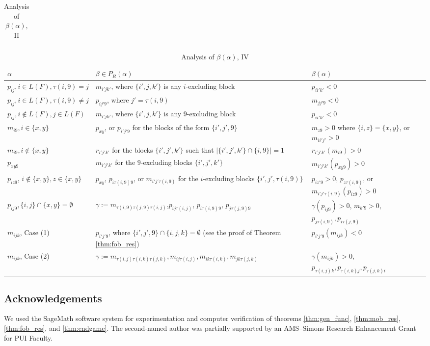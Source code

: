 \documentclass[11pt]{amsart}
\theoremstyle{plain}
\theoremstyle{definition}
\theoremstyle{remark}
\numberwithin{equation}{section}
\newcommand{\al}{\alpha}
\newcommand{\be}{\beta}
\newcommand{\pra}{P_R(\al)}
\newcommand{\abs}[1]{\lvert #1 \rvert}
\begin{document}
\begin{landscape}
\begin{table}[b]
\begin{tabular}{@{}lll@{}}
\end{tabular}
\caption{Analysis of $\be(\al)$, II}
\label{tab:mob2}
\end{table}
%
\begin{table}[b]
  \centering
\begin{tabular}{@{}lll@{}}
\toprule
  $\al$ & $\be\in \pra$ & $\be(\al)$ \\
  \midrule
  $p_{ij}, i\in L(F), \tau(i,9)=j$ & $m_{i'jk'}$, where $\{i',j,k'\}$ is any
 $i$-excluding block & $p_{ii'k'}<0$ \\
  $p_{ij}, i\in L(F),\tau(i,9)\neq j$ & $p_{ij'9}$, where $j'=\tau(i,9)$ & $m_{jj'9}<0$\\
  $p_{ij}, i\notin L(F), j\in L(F)$ & $m_{i'jk'}$, where $\{i',j,k'\}$ is any
 $9$-excluding block& $p_{ii'k'}<0$\\
  \midrule
  $m_{i9}, i\in \{x,y\}$ & $p_{xy}$, or $p_{i'j'9}$ for the blocks of the form
  $\{i',j',9\}$ & $m_{z9}>0$ where $\{i,z\}=\{x,y\}$, or $m_{ii'j'}>0$\\
  $m_{i9}, i\notin\{x,y\}$ & $r_{i'j'k'}$ for the blocks $\{i',j',k'\}$ such that $\abs{\{i',j',k'\}\cap \{i,9\}}=1$& $r_{i'j'k'}(m_{i9})>0$ \\
  \midrule
  $p_{xy9}$ & $m_{i'j'k'}$ for the $9$-excluding blocks $\{i',j',k'\}$  & $m_{i'j'k'}(p_{xy9})>0$\\
  $p_{iz9}$, $i\notin \{x,y\},z\in \{x,y\}$ & $p_{xy}$, $p_{i\tau(i,9)9}$, or
  $m_{i'j'\tau(i,9)}$ for the $i$-excluding blocks $\{i',j',\tau(i,9)\}$& $p_{iz'9}>0$,
$p_{z\tau(i,9)}$, or $m_{i'j'\tau(i,9)}(p_{iz9})>0$\\ 
  $p_{ij9}, \{i,j\}\cap \{x,y\}=\emptyset$ &
  $\gamma:=m_{\tau(i,9)\tau(j,9)\tau(i,j)}$,$p_{ij\tau(i,j)}$,
  $p_{i\tau(i,9)9}$, $p_{j\tau(j,9)9}$ & $\gamma(p_{ij9})>0$, $m_{k'9}>0$,
  $p_{j\tau(i,9)}, p_{i\tau(j,9)}$\\
  \midrule
  $m_{ijk}$, Case (1) & $p_{i'j'9}$, where $\{i',j',9\}\cap\{i,j,k\}=\emptyset$
  (see the proof of Theorem \ref{thm:fob_res}) & $p_{i'j'9}(m_{ijk})<0$\\
  $m_{ijk}$, Case (2) & $\gamma:=m_{\tau(i,j)\tau(i,k)\tau(j,k)}, m_{ij\tau(i,j)},m_{ik\tau(i,k)}, m_{jk\tau(j,k)}
  $ & $\gamma(m_{ijk})>0$, $p_{\tau(i,j)k},p_{\tau(i,k)j}, p_{\tau(j,k)i}$\\
  \bottomrule
\end{tabular}
\caption{Analysis of $\be(\al)$, IV}
\label{tab:fob2}
\end{table}
\end{landscape}


\subsection*{Acknowledgements}
We used the SageMath software system \cite{sage} for experimentation and
computer verification of theorems \ref{thm:gen_func}, \ref{thm:mob_res},
\ref{thm:fob_res}, and \ref{thm:endgame}. The second-named author was partially
supported by an AMS--Simons Research Enhancement Grant for PUI Faculty.

 
\end{document}
